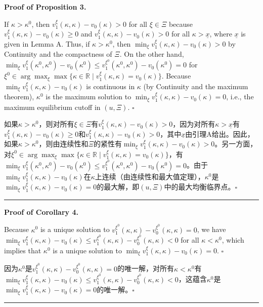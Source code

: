 \documentclass[12pt,a4paper]{article}
\newenvironment{original}
  {\par\medskip\noindent\color{black}\ignorespaces}
  {\par\medskip}
\newenvironment{translation}
  {\par\noindent\color{darkblue}\ignorespaces}
  {\par\medskip\noindent\hrule\par\medskip}
\theoremstyle{definition}
\theoremstyle{remark}
\begin{document}
\medskip
\noindent\textbf{Proof of Proposition 3.}
\begin{original}
If $\kappa > \kappa^0$, then $v_1^\xi(\kappa, \kappa) - v_0(\kappa) > 0$ for all $\xi \in \Xi$ because $v_1^\xi(\kappa, \kappa) - v_0(\kappa) \ge 0$ and $v_1^\xi(\kappa, \kappa) - v_0(\kappa) > 0$ for all $\kappa > \underline{x}$, where $\underline{x}$ is given in Lemma A. Thus, if $\kappa > \kappa^0$, then $\min_{\xi} v_1^\xi(\kappa, \kappa) - v_0(\kappa) > 0$ by Continuity and the compactness of $\Xi$. On the other hand, $\min_{\xi} v_1^\xi(\kappa^0, \kappa^0) - v_0(\kappa^0) \le v_1^{\xi^0}(\kappa^0, \kappa^0) - v_0(\kappa^0) = 0$ for $\xi^0 \in \arg\max_{\xi} \max\{\kappa \in \mathbb{R} \mid v_1^\xi(\kappa, \kappa) = v_0(\kappa)\}$. Because $\min_{\xi} v_1^\xi(\kappa, \kappa) - v_0(\kappa)$ is continuous in $\kappa$ (by Continuity and the maximum theorem), $\kappa^0$ is the maximum solution to $\min_{\xi} v_1^\xi(\kappa, \kappa) - v_0(\kappa) = 0$, i.e., the maximum equilibrium cutoff in $(u, \Xi)$. $\square$
\end{original}
\begin{translation}
如果$\kappa > \kappa^0$，则对所有$\xi \in \Xi$有$v_1^\xi(\kappa, \kappa) - v_0(\kappa) > 0$，因为对所有$\kappa > \underline{x}$有$v_1^\xi(\kappa, \kappa) - v_0(\kappa) \ge 0$和$v_1^\xi(\kappa, \kappa) - v_0(\kappa) > 0$，其中$\underline{x}$由引理A给出。因此，如果$\kappa > \kappa^0$，则由连续性和$\Xi$的紧性有$\min_{\xi} v_1^\xi(\kappa, \kappa) - v_0(\kappa) > 0$。另一方面，对$\xi^0 \in \arg\max_{\xi} \max\{\kappa \in \mathbb{R} \mid v_1^\xi(\kappa, \kappa) = v_0(\kappa)\}$，有$\min_{\xi} v_1^\xi(\kappa^0, \kappa^0) - v_0(\kappa^0) \le v_1^{\xi^0}(\kappa^0, \kappa^0) - v_0(\kappa^0) = 0$。由于$\min_{\xi} v_1^\xi(\kappa, \kappa) - v_0(\kappa)$在$\kappa$上连续（由连续性和最大值定理），$\kappa^0$是$\min_{\xi} v_1^\xi(\kappa, \kappa) - v_0(\kappa) = 0$的最大解，即$(u, \Xi)$中的最大均衡临界点。$\square$
\end{translation}

\medskip
\noindent\textbf{Proof of Corollary 4.}
\begin{original}
Because $\kappa^0$ is a unique solution to $v_1^{\xi^0}(\kappa, \kappa) - v_0^{\xi^0}(\kappa, \kappa) = 0$, we have $\min_{\xi} v_1^\xi(\kappa, \kappa) - v_0(\kappa) \le v_1^{\xi^0}(\kappa, \kappa) - v_0^{\xi^0}(\kappa, \kappa) < 0$ for all $\kappa < \kappa^0$, which implies that $\kappa^0$ is a unique solution to $\min_{\xi} v_1^\xi(\kappa, \kappa) - v_0(\kappa) = 0$. $\square$
\end{original}
\begin{translation}
因为$\kappa^0$是$v_1^{\xi^0}(\kappa, \kappa) - v_0^{\xi^0}(\kappa, \kappa) = 0$的唯一解，对所有$\kappa < \kappa^0$有$\min_{\xi} v_1^\xi(\kappa, \kappa) - v_0(\kappa) \le v_1^{\xi^0}(\kappa, \kappa) - v_0^{\xi^0}(\kappa, \kappa) < 0$，这蕴含$\kappa^0$是$\min_{\xi} v_1^\xi(\kappa, \kappa) - v_0(\kappa) = 0$的唯一解。$\square$
\end{translation}
\end{document}
